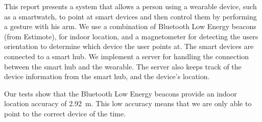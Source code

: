 This report presents a system that allows a person using a wearable device, such as a smartwatch, to point at smart devices and then control them by performing a gesture with his arm. We use a combination of Bluetooth Low Energy beacons (from Estimote), for indoor location, and a magnetometer for detecting the users orientation to determine which device the user points at. The smart devices are connected to a smart hub. We implement a server for handling the connection between the smart hub and the wearable. The server also keeps track of the device information from the smart hub, and the device's location.

Our tests show that the Bluetooth Low Energy beacons provide an indoor location accuracy of \SI{2.92}{\meter}. This low accuracy means that we are only able to point to the correct device  of the time. 